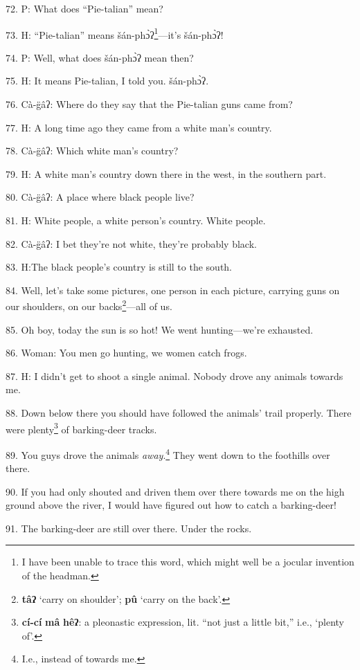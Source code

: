 72. P: What does ``Pie-talian'' mean?

73. H: ``Pie-talian'' means šán-phɔ̀ʔ\footnote{I have been unable to trace this word, which might well be a jocular invention of the headman.}---it's šán-phɔ̀ʔ!

74. P: Well, what does šán-phɔ̀ʔ mean then?

75. H: It means Pie-talian, I told you. šán-phɔ̀ʔ.

76. Cà-g̈âʔ: Where do they say that the Pie-talian guns came from?

77. H: A long time ago they came from a white man's country.

78. Cà-g̈âʔ: Which white man's country?

79. H: A white man's country down there in the west, in the southern part.

80. Cà-g̈âʔ: A place where black people live?

81. H: White people, a white person's country. White people.

82. Cà-g̈âʔ: I bet they're not white, they're probably black.

83. H:The black people's country is still to the south.


84. Well, let's take some pictures, one person in each picture, carrying guns on
our shoulders, on our backs\footnote{\textbf{tâʔ} `carry on shoulder'; \textbf{pû} `carry on the back'.}---all of us.

85. Oh boy, today the sun is so hot! We went hunting---we're exhausted.

86. Woman: You men go hunting, we women catch frogs.

87. H: I didn't get to shoot a single animal. Nobody drove any animals towards
me.

88. Down below there you should have followed the animals' trail properly. There
were plenty\footnote{\textbf{cí-cí} \textbf{mâ} \textbf{hêʔ}: a pleonastic expression, lit. ``not just a little bit,'' i.e., `plenty of'.} of barking-deer tracks.

89. You guys drove the animals \textit{away}.\footnote{I.e., instead of towards me.} They went down to the foothills
over there.

90. If you had only shouted and driven them over there towards me on the high ground
above the river, I would have figured out how to catch a barking-deer!

91. The barking-deer are still over there. Under the rocks.

